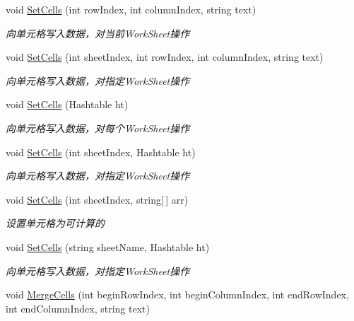\begin{DoxyCompactItemize}
void \hyperlink{class_x_c_l_net_tools_1_1_data_handler_1_1_excel_helper_a1210a9f840d18b18bec230c71eb00564}{Set\-Cells} (int row\-Index, int column\-Index, string text)
\begin{DoxyCompactList}\small\item\em 向单元格写入数据，对当前\-Work\-Sheet操作 \end{DoxyCompactList}\item 
void \hyperlink{class_x_c_l_net_tools_1_1_data_handler_1_1_excel_helper_a851825a1eac4c7b8f6644be7ae994bc8}{Set\-Cells} (int sheet\-Index, int row\-Index, int column\-Index, string text)
\begin{DoxyCompactList}\small\item\em 向单元格写入数据，对指定\-Work\-Sheet操作 \end{DoxyCompactList}\item 
void \hyperlink{class_x_c_l_net_tools_1_1_data_handler_1_1_excel_helper_aea03ad91a4cf8544451b8688811a9b26}{Set\-Cells} (Hashtable ht)
\begin{DoxyCompactList}\small\item\em 向单元格写入数据，对每个\-Work\-Sheet操作 \end{DoxyCompactList}\item 
void \hyperlink{class_x_c_l_net_tools_1_1_data_handler_1_1_excel_helper_aa6e6c74debacaac3b04226ca46001829}{Set\-Cells} (int sheet\-Index, Hashtable ht)
\begin{DoxyCompactList}\small\item\em 向单元格写入数据，对指定\-Work\-Sheet操作 \end{DoxyCompactList}\item 
void \hyperlink{class_x_c_l_net_tools_1_1_data_handler_1_1_excel_helper_a66b9b212bd2aec9dc7baf82f7199c362}{Set\-Cells} (int sheet\-Index, string\mbox{[}$\,$\mbox{]} arr)
\begin{DoxyCompactList}\small\item\em 设置单元格为可计算的 \end{DoxyCompactList}\item 
void \hyperlink{class_x_c_l_net_tools_1_1_data_handler_1_1_excel_helper_a95225de93f22b335ddde6d68a3a424e7}{Set\-Cells} (string sheet\-Name, Hashtable ht)
\begin{DoxyCompactList}\small\item\em 向单元格写入数据，对指定\-Work\-Sheet操作 \end{DoxyCompactList}\item 
void \hyperlink{class_x_c_l_net_tools_1_1_data_handler_1_1_excel_helper_ac153094d1d3d435a3f56a673ce95efc1}{Merge\-Cells} (int begin\-Row\-Index, int begin\-Column\-Index, int end\-Row\-Index, int end\-Column\-Index, string text)

\end{DoxyCompactItemize}
